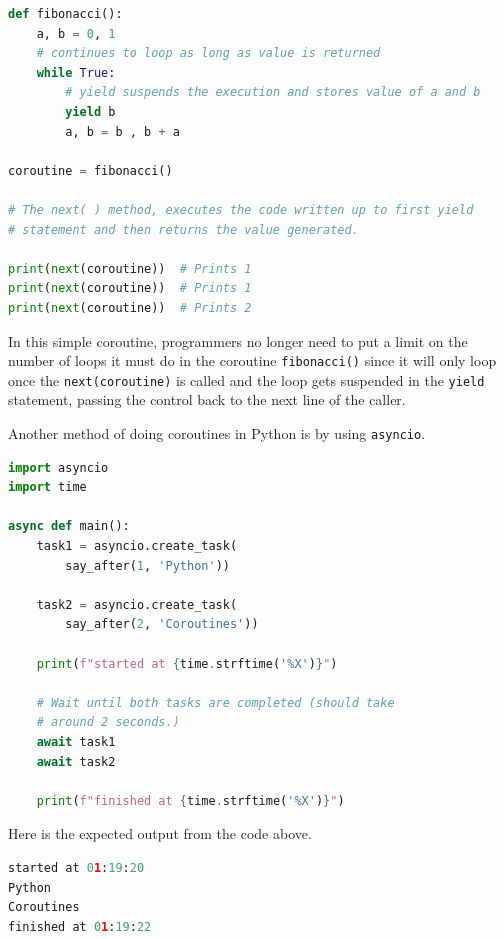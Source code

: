 \documentclass{article}
\begin{document}


\begin{lstlisting}[language=Python]
def fibonacci():
    a, b = 0, 1
    # continues to loop as long as value is returned
    while True:
        # yield suspends the execution and stores value of a and b
        yield b
        a, b = b , b + a

coroutine = fibonacci()

# The next( ) method, executes the code written up to first yield
# statement and then returns the value generated.

print(next(coroutine))  # Prints 1
print(next(coroutine))  # Prints 1
print(next(coroutine))  # Prints 2

\end{lstlisting}

\par
In this simple coroutine, programmers no longer need to put a limit on the number of loops it must do in the coroutine \texttt{fibonacci()} since it will only loop once the \texttt{next(coroutine)} is called and the loop gets suspended in the \texttt{yield} statement, passing the control back to the next line of the caller.

\par
Another method of doing coroutines in Python is by using \texttt{asyncio}.

\begin{lstlisting}[language=Python]
import asyncio
import time

async def main():
    task1 = asyncio.create_task(
        say_after(1, 'Python'))

    task2 = asyncio.create_task(
        say_after(2, 'Coroutines'))

    print(f"started at {time.strftime('%X')}")

    # Wait until both tasks are completed (should take
    # around 2 seconds.)
    await task1
    await task2

    print(f"finished at {time.strftime('%X')}")
\end{lstlisting}

\par
Here is the expected output from the code above.

\begin{lstlisting}[language=Python]
started at 01:19:20
Python
Coroutines
finished at 01:19:22
\end{lstlisting}
\end{document}

